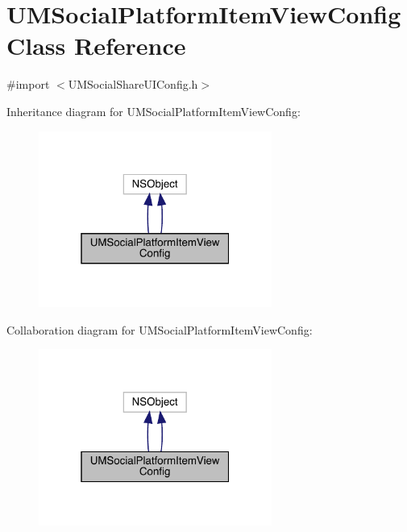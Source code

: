 \hypertarget{interface_u_m_social_platform_item_view_config}{}\section{U\+M\+Social\+Platform\+Item\+View\+Config Class Reference}
\label{interface_u_m_social_platform_item_view_config}


{\ttfamily \#import $<$U\+M\+Social\+Share\+U\+I\+Config.\+h$>$}



Inheritance diagram for U\+M\+Social\+Platform\+Item\+View\+Config\+:\nopagebreak
\begin{figure}[H]
\begin{center}
\leavevmode
\includegraphics[width=217pt]{interface_u_m_social_platform_item_view_config__inherit__graph}
\end{center}
\end{figure}


Collaboration diagram for U\+M\+Social\+Platform\+Item\+View\+Config\+:\nopagebreak
\begin{figure}[H]
\begin{center}
\leavevmode
\includegraphics[width=217pt]{interface_u_m_social_platform_item_view_config__coll__graph}
\end{center}
\end{figure}
